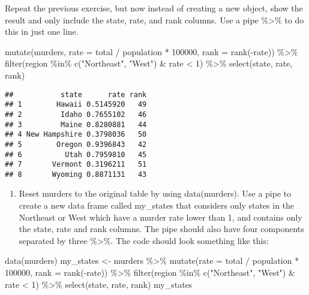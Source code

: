 \documentclass[
]{article}
\newenvironment{Shaded}{\begin{snugshade}}{\end{snugshade}}
\newcommand{\AttributeTok}[1]{\textcolor[rgb]{0.77,0.63,0.00}{#1}}
\newcommand{\DecValTok}[1]{\textcolor[rgb]{0.00,0.00,0.81}{#1}}
\newcommand{\FunctionTok}[1]{\textcolor[rgb]{0.00,0.00,0.00}{#1}}
\newcommand{\NormalTok}[1]{#1}
\newcommand{\OtherTok}[1]{\textcolor[rgb]{0.56,0.35,0.01}{#1}}
\newcommand{\SpecialCharTok}[1]{\textcolor[rgb]{0.00,0.00,0.00}{#1}}
\newcommand{\StringTok}[1]{\textcolor[rgb]{0.31,0.60,0.02}{#1}}
\providecommand{\tightlist}{%
  \setlength{\itemsep}{0pt}\setlength{\parskip}{0pt}}
\begin{document}
Repeat the previous exercise, but now instead of creating a new object,
show the result and only include the state, rate, and rank columns. Use
a pipe \%\textgreater\% to do this in just one line.

\begin{Shaded}
\begin{Highlighting}[]
\FunctionTok{mutate}\NormalTok{(murders, }\AttributeTok{rate =}\NormalTok{  total }\SpecialCharTok{/}\NormalTok{ population }\SpecialCharTok{*} \DecValTok{100000}\NormalTok{, }\AttributeTok{rank =} \FunctionTok{rank}\NormalTok{(}\SpecialCharTok{{-}}\NormalTok{rate)) }\SpecialCharTok{\%\textgreater{}\%} \FunctionTok{filter}\NormalTok{(region }\SpecialCharTok{\%in\%} \FunctionTok{c}\NormalTok{(}\StringTok{"Northeast"}\NormalTok{, }\StringTok{"West"}\NormalTok{) }\SpecialCharTok{\&}\NormalTok{ rate }\SpecialCharTok{\textless{}} \DecValTok{1}\NormalTok{) }\SpecialCharTok{\%\textgreater{}\%} \FunctionTok{select}\NormalTok{(state, rate, rank) }
\end{Highlighting}
\end{Shaded}

\begin{verbatim}
##           state      rate rank
## 1        Hawaii 0.5145920   49
## 2         Idaho 0.7655102   46
## 3         Maine 0.8280881   44
## 4 New Hampshire 0.3798036   50
## 5        Oregon 0.9396843   42
## 6          Utah 0.7959810   45
## 7       Vermont 0.3196211   51
## 8       Wyoming 0.8871131   43
\end{verbatim}

\begin{enumerate}
\def\labelenumi{\arabic{enumi}.}
\setcounter{enumi}{1}
\tightlist
\item
  Reset murders to the original table by using data(murders). Use a pipe
  to create a new data frame called my\_states that considers only
  states in the Northeast or West which have a murder rate lower than 1,
  and contains only the state, rate and rank columns. The pipe should
  also have four components separated by three \%\textgreater\%. The
  code should look something like this:
\end{enumerate}

\begin{Shaded}
\begin{Highlighting}[]
\FunctionTok{data}\NormalTok{(murders)}
\NormalTok{my\_states }\OtherTok{\textless{}{-}}\NormalTok{ murders }\SpecialCharTok{\%\textgreater{}\%} \FunctionTok{mutate}\NormalTok{(}\AttributeTok{rate =}\NormalTok{  total }\SpecialCharTok{/}\NormalTok{ population }\SpecialCharTok{*} \DecValTok{100000}\NormalTok{, }\AttributeTok{rank =} \FunctionTok{rank}\NormalTok{(}\SpecialCharTok{{-}}\NormalTok{rate)) }\SpecialCharTok{\%\textgreater{}\%} \FunctionTok{filter}\NormalTok{(region }\SpecialCharTok{\%in\%} \FunctionTok{c}\NormalTok{(}\StringTok{"Northeast"}\NormalTok{, }\StringTok{"West"}\NormalTok{) }\SpecialCharTok{\&}\NormalTok{ rate }\SpecialCharTok{\textless{}} \DecValTok{1}\NormalTok{) }\SpecialCharTok{\%\textgreater{}\%} \FunctionTok{select}\NormalTok{(state, rate, rank)}
\NormalTok{my\_states}
\end{Highlighting}
\end{Shaded}
\end{document}
